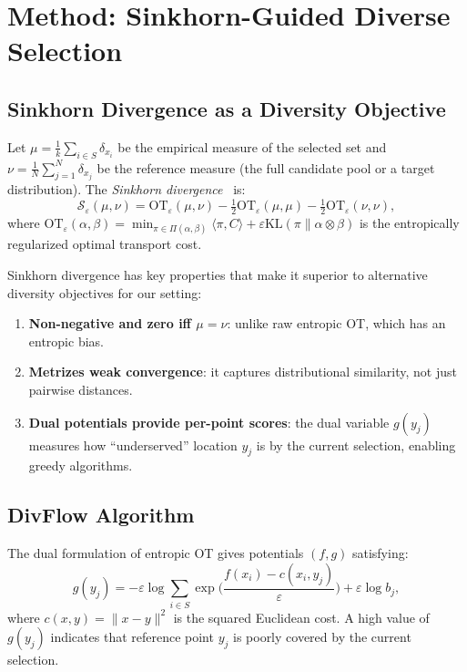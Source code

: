 \documentclass[10pt]{article}
\begin{document}
\section{Method: Sinkhorn-Guided Diverse Selection}
\label{sec:method}

\subsection{Sinkhorn Divergence as a Diversity Objective}

Let $\mu = \frac{1}{k}\sum_{i \in S} \delta_{x_i}$ be the empirical measure of the selected set and $\nu = \frac{1}{N}\sum_{j=1}^{N} \delta_{x_j}$ be the reference measure (the full candidate pool or a target distribution).
The \emph{Sinkhorn divergence}~\citep{cuturi2013sinkhorn, feydy2019interpolating} is:
\begin{equation}
\mathcal{S}_\varepsilon(\mu, \nu) = \text{OT}_\varepsilon(\mu, \nu) - \tfrac{1}{2}\text{OT}_\varepsilon(\mu, \mu) - \tfrac{1}{2}\text{OT}_\varepsilon(\nu, \nu),
\label{eq:sinkhorn}
\end{equation}
where $\text{OT}_\varepsilon(\alpha, \beta) = \min_{\pi \in \Pi(\alpha,\beta)} \langle \pi, C \rangle + \varepsilon \text{KL}(\pi \| \alpha \otimes \beta)$ is the entropically regularized optimal transport cost.

Sinkhorn divergence has key properties that make it superior to alternative diversity objectives for our setting:
\begin{enumerate}[leftmargin=*,itemsep=1pt]
  \item \textbf{Non-negative and zero iff $\mu = \nu$}: unlike raw entropic OT, which has an entropic bias.
  \item \textbf{Metrizes weak convergence}: it captures distributional similarity, not just pairwise distances.
  \item \textbf{Dual potentials provide per-point scores}: the dual variable $g(y_j)$ measures how ``underserved'' location $y_j$ is by the current selection, enabling greedy algorithms.
\end{enumerate}

\subsection{DivFlow Algorithm}

The dual formulation of entropic OT gives potentials $(f, g)$ satisfying:
\begin{equation}
g(y_j) = -\varepsilon \log \sum_{i \in S} \exp\!\Big(\frac{f(x_i) - c(x_i, y_j)}{\varepsilon}\Big) + \varepsilon \log b_j,
\end{equation}
where $c(x,y) = \|x-y\|^2$ is the squared Euclidean cost.
A high value of $g(y_j)$ indicates that reference point $y_j$ is poorly covered by the current selection.
\end{document}
